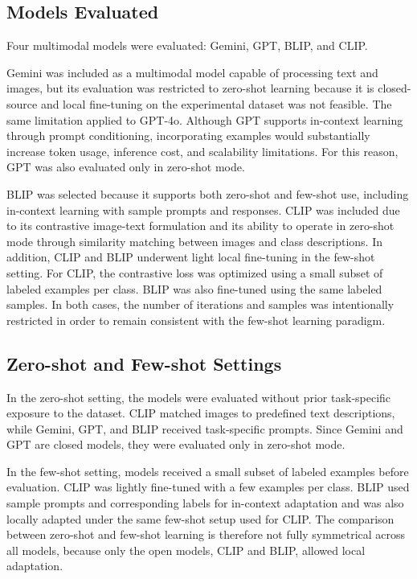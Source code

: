\subsection{Models Evaluated}

Four multimodal models were evaluated: Gemini, GPT, BLIP, and CLIP.

Gemini was included as a multimodal model capable of processing text and images, but its evaluation was restricted to zero-shot learning because it is closed-source and local fine-tuning on the experimental dataset was not feasible. The same limitation applied to GPT-4o. Although GPT supports in-context learning through prompt conditioning, incorporating examples would substantially increase token usage, inference cost, and scalability limitations. For this reason, GPT was also evaluated only in zero-shot mode.

BLIP was selected because it supports both zero-shot and few-shot use, including in-context learning with sample prompts and responses. CLIP was included due to its contrastive image-text formulation and its ability to operate in zero-shot mode through similarity matching between images and class descriptions. In addition, CLIP and BLIP underwent light local fine-tuning in the few-shot setting. For CLIP, the contrastive loss was optimized using a small subset of labeled examples per class. BLIP was also fine-tuned using the same labeled samples. In both cases, the number of iterations and samples was intentionally restricted in order to remain consistent with the few-shot learning paradigm.

\subsection{Zero-shot and Few-shot Settings}

In the zero-shot setting, the models were evaluated without prior task-specific exposure to the dataset. CLIP matched images to predefined text descriptions, while Gemini, GPT, and BLIP received task-specific prompts. Since Gemini and GPT are closed models, they were evaluated only in zero-shot mode.

In the few-shot setting, models received a small subset of labeled examples before evaluation. CLIP was lightly fine-tuned with a few examples per class. BLIP used sample prompts and corresponding labels for in-context adaptation and was also locally adapted under the same few-shot setup used for CLIP. The comparison between zero-shot and few-shot learning is therefore not fully symmetrical across all models, because only the open models, CLIP and BLIP, allowed local adaptation.

